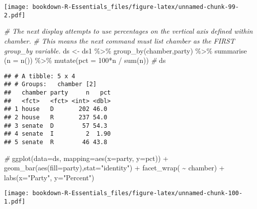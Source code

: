 \documentclass[
]{book}
\newenvironment{Shaded}{\begin{snugshade}}{\end{snugshade}}
\newcommand{\AttributeTok}[1]{\textcolor[rgb]{0.77,0.63,0.00}{#1}}
\newcommand{\CommentTok}[1]{\textcolor[rgb]{0.56,0.35,0.01}{\textit{#1}}}
\newcommand{\DecValTok}[1]{\textcolor[rgb]{0.00,0.00,0.81}{#1}}
\newcommand{\FunctionTok}[1]{\textcolor[rgb]{0.00,0.00,0.00}{#1}}
\newcommand{\NormalTok}[1]{#1}
\newcommand{\OtherTok}[1]{\textcolor[rgb]{0.56,0.35,0.01}{#1}}
\newcommand{\SpecialCharTok}[1]{\textcolor[rgb]{0.00,0.00,0.00}{#1}}
\newcommand{\StringTok}[1]{\textcolor[rgb]{0.31,0.60,0.02}{#1}}
\begin{document}
\texttt{[image: bookdown-R-Essentials\_files/figure-latex/unnamed-chunk-99-2.pdf]}

\begin{Shaded}
\begin{Highlighting}[]
\CommentTok{\#  The next display attempts to use percentages on the vertical axis defined within chamber.}
\CommentTok{\# This means the next command must list chamber as the FIRST group\_by variable.}
\NormalTok{ds }\OtherTok{\textless{}{-}}\NormalTok{ ds1 }\SpecialCharTok{\%\textgreater{}\%} \FunctionTok{group\_by}\NormalTok{(chamber,party)  }\SpecialCharTok{\%\textgreater{}\%}
   \FunctionTok{summarise}\NormalTok{ (}\AttributeTok{n =} \FunctionTok{n}\NormalTok{()) }\SpecialCharTok{\%\textgreater{}\%}
  \FunctionTok{mutate}\NormalTok{(}\AttributeTok{pct =} \DecValTok{100}\SpecialCharTok{*}\NormalTok{n }\SpecialCharTok{/} \FunctionTok{sum}\NormalTok{(n)) }
\CommentTok{\#}
\NormalTok{ds}
\end{Highlighting}
\end{Shaded}

\begin{verbatim}
## # A tibble: 5 x 4
## # Groups:   chamber [2]
##   chamber party     n   pct
##   <fct>   <fct> <int> <dbl>
## 1 house   D       202 46.0 
## 2 house   R       237 54.0 
## 3 senate  D        57 54.3 
## 4 senate  I         2  1.90
## 5 senate  R        46 43.8
\end{verbatim}

\begin{Shaded}
\begin{Highlighting}[]
\CommentTok{\#}
\FunctionTok{ggplot}\NormalTok{(}\AttributeTok{data=}\NormalTok{ds, }\AttributeTok{mapping=}\FunctionTok{aes}\NormalTok{(}\AttributeTok{x=}\NormalTok{party, }\AttributeTok{y=}\NormalTok{pct)) }\SpecialCharTok{+} 
  \FunctionTok{geom\_bar}\NormalTok{(}\FunctionTok{aes}\NormalTok{(}\AttributeTok{fill=}\NormalTok{party),}\AttributeTok{stat=}\StringTok{"identity"}\NormalTok{) }\SpecialCharTok{+}
  \FunctionTok{facet\_wrap}\NormalTok{( }\SpecialCharTok{\textasciitilde{}}\NormalTok{ chamber) }\SpecialCharTok{+}
  \FunctionTok{labs}\NormalTok{(}\AttributeTok{x=}\StringTok{"Party"}\NormalTok{, }\AttributeTok{y=}\StringTok{"Percent"}\NormalTok{)}
\end{Highlighting}
\end{Shaded}

\texttt{[image: bookdown-R-Essentials\_files/figure-latex/unnamed-chunk-100-1.pdf]}
\end{document}
